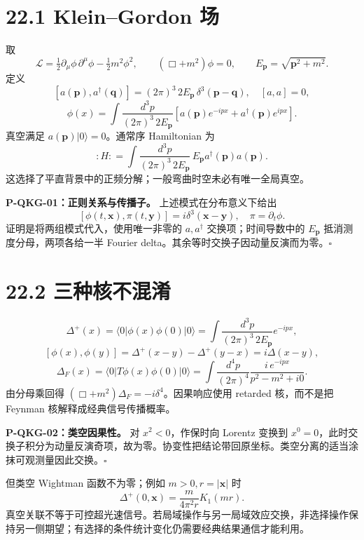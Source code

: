 \documentclass[
  11pt,
  oneside]{book}
\begin{document}
\hypertarget{kleingordon-ux573a}{%
\section{22.1 Klein--Gordon 场}\label{kleingordon-ux573a}}

取 \[
\mathcal L=\tfrac12\partial_\mu\phi\,\partial^\mu\phi-\tfrac12m^2\phi^2,\qquad
(\Box+m^2)\phi=0,\qquad E_{\mathbf p}=\sqrt{\mathbf p^2+m^2}.
\] 定义 \[
[a(\mathbf p),a^\dagger(\mathbf q)]=(2\pi)^3\,2E_{\mathbf p}\,
\delta^3(\mathbf p-\mathbf q),\quad [a,a]=0,
\] \[
\phi(x)=\int\frac{d^3p}{(2\pi)^3\,2E_{\mathbf p}}
\left[a(\mathbf p)e^{-ipx}+a^\dagger(\mathbf p)e^{ipx}\right].
\] 真空满足 \(a(\mathbf p)|0\rangle=0\)。通常序 Hamiltonian 为 \[
:H: =\int\frac{d^3p}{(2\pi)^3\,2E_{\mathbf p}}\,
E_{\mathbf p}a^\dagger(\mathbf p)a(\mathbf p).
\] 这选择了平直背景中的正频分解；一般弯曲时空未必有唯一全局真空。

\protect\hypertarget{p-qkg-01}{}{}

\textbf{P-QKG-01：正则关系与传播子。} 上述模式在分布意义下给出 \[
[\phi(t,\mathbf x),\pi(t,\mathbf y)]=i\delta^3(\mathbf x-\mathbf y),
\quad \pi=\partial_t\phi.
\] 证明是将两组模式代入，使用唯一非零的 \(a,a^\dagger\)
交换项；时间导数中的 \(E_{\mathbf p}\) 抵消测度分母，两项各给一半
Fourier delta。其余等时交换子因动量反演而为零。\(\square\)

\hypertarget{ux4e09ux79cdux6838ux4e0dux6df7ux6dc6}{%
\section{22.2 三种核不混淆}\label{ux4e09ux79cdux6838ux4e0dux6df7ux6dc6}}

\[
\Delta^+(x)=\langle0|\phi(x)\phi(0)|0\rangle
=\int\frac{d^3p}{(2\pi)^3\,2E_{\mathbf p}}e^{-ipx},
\] \[
[\phi(x),\phi(y)]=\Delta^+(x-y)-\Delta^+(y-x)=i\Delta(x-y),
\] \[
\Delta_F(x)=\langle0|T\phi(x)\phi(0)|0\rangle
=\int\frac{d^4p}{(2\pi)^4}\frac{i\,e^{-ipx}}{p^2-m^2+i0}.
\] 由分母乘回得 \((\Box+m^2)\Delta_F=-i\delta^4\)。因果响应使用 retarded
核，而不是把 Feynman 核解释成经典信号传播概率。

\protect\hypertarget{p-qkg-02}{}{}

\textbf{P-QKG-02：类空因果性。} 对 \(x^2<0\)，作保时向 Lorentz 变换到
\(x^0=0\)，此时交换子积分为动量反演奇项，故为零。协变性把结论带回原坐标。类空分离的适当涂抹可观测量因此交换。\(\square\)

但类空 Wightman 函数不为零；例如 \(m>0,r=|\mathbf x|\) 时 \[
\Delta^+(0,\mathbf x)=\frac{m}{4\pi^2r}K_1(mr).
\]
真空关联不等于可控超光速信号。若局域操作与另一局域效应交换，非选择操作保持另一侧期望；有选择的条件统计变化仍需要经典结果通信才能利用。
\end{document}
